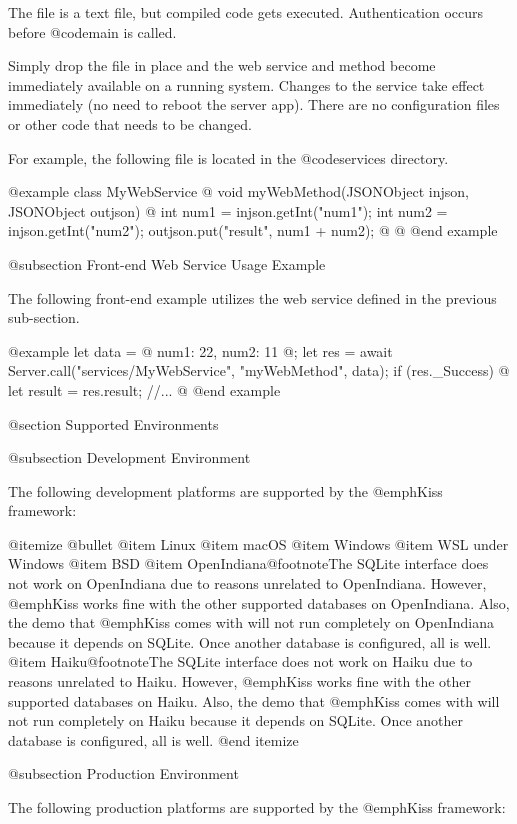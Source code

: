 The file is a text file, but compiled code gets executed.
Authentication occurs before @code{main} is called.

Simply drop the file in place and the web service and method become
immediately available on a running system.  Changes to the service
take effect immediately (no need to reboot the server app).  There are
no configuration files or other code that needs to be changed.

For example, the following file is located in the
@code{services} directory.

@example
class MyWebService @{
    void myWebMethod(JSONObject injson, JSONObject outjson) @{
        int num1 = injson.getInt("num1");
        int num2 = injson.getInt("num2");
        outjson.put("result", num1 + num2);
    @}
@}
@end example

@subsection Front-end Web Service Usage Example

The following front-end example utilizes the web service defined in the
previous sub-section.

@example
let data = @{
    num1:  22,
    num2:  11
@};
let res = await Server.call("services/MyWebService", "myWebMethod", data);
if (res._Success) @{
    let result = res.result;
    //...
@}
@end example
    

@section Supported Environments

@subsection Development Environment

The following development platforms are supported by the @emph{Kiss}
framework:

@itemize @bullet
@item
Linux
@item
macOS
@item
Windows
@item
WSL under Windows
@item
BSD
@item
OpenIndiana@footnote{The SQLite interface does not work on OpenIndiana due to reasons unrelated to OpenIndiana.
However, @emph{Kiss} works fine with the other supported databases on OpenIndiana.  Also, the demo that @emph{Kiss} comes with will not
run completely on OpenIndiana because it depends on SQLite.  Once another database is configured, all is well.}
@item
Haiku@footnote{The SQLite interface does not work on Haiku due to reasons unrelated to Haiku.
However, @emph{Kiss} works fine with the other supported databases on Haiku.  Also, the demo that @emph{Kiss} comes with will not
run completely on Haiku because it depends on SQLite.  Once another database is configured, all is well.}
@end itemize

@subsection Production Environment


The following production platforms are supported by the @emph{Kiss}
framework:

